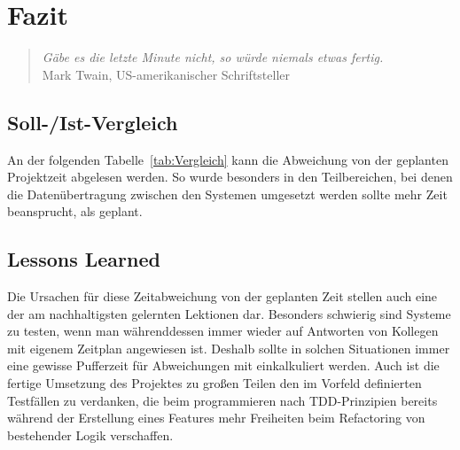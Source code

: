 \section{Fazit} 
\label{sec:Fazit}

\begin{quote}
    \textit{Gäbe es die letzte Minute nicht, so würde niemals etwas fertig.}\\
    Mark Twain, US-amerikanischer Schriftsteller
\end{quote}

\subsection{Soll-/Ist-Vergleich}
\label{sec:SollIstVergleich}

An der folgenden Tabelle~\ref{tab:Vergleich} kann die Abweichung von der geplanten Projektzeit abgelesen werden. So wurde besonders in den Teilbereichen, bei denen die Datenübertragung zwischen den Systemen umgesetzt werden sollte mehr Zeit beansprucht, als geplant.


\subsection{Lessons Learned}
\label{sec:LessonsLearned}

Die Ursachen für diese Zeitabweichung von der geplanten Zeit stellen auch eine der am nachhaltigsten gelernten Lektionen dar. Besonders schwierig sind Systeme zu testen, wenn man währenddessen immer wieder auf Antworten von Kollegen mit eigenem Zeitplan angewiesen ist. Deshalb sollte in solchen Situationen immer eine gewisse Pufferzeit für Abweichungen mit einkalkuliert werden. Auch ist die fertige Umsetzung des Projektes zu großen Teilen den im Vorfeld definierten Testfällen zu verdanken, die beim programmieren nach \ac{TDD}-Prinzipien bereits während der Erstellung eines Features mehr Freiheiten beim Refactoring von bestehender Logik verschaffen.

